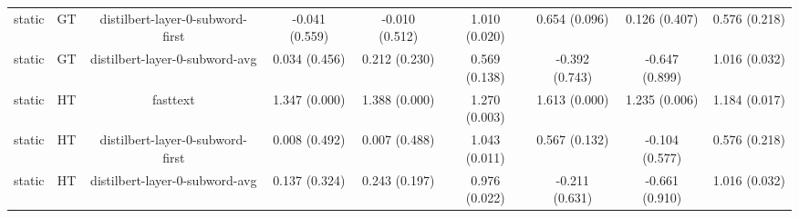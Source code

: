 \begin{sidewaystable}[htb]
\begin{tabular}{@{}ccccccccc@{}}
        static & GT & distilbert-layer-0-subword-first & -0.041 (0.559) & -0.010 (0.512) & 1.010 (0.020) & 0.654 (0.096) & 0.126 (0.407) & 0.576 (0.218) \\
        static & GT & distilbert-layer-0-subword-avg & 0.034 (0.456) & 0.212 (0.230) & 0.569 (0.138) & -0.392 (0.743) & -0.647 (0.899) & 1.016 (0.032) \\
        static & HT & fasttext & 1.347 (0.000) & 1.388 (0.000) & 1.270 (0.003) & 1.613 (0.000) & 1.235 (0.006) & 1.184 (0.017) \\
        static & HT & distilbert-layer-0-subword-first & 0.008 (0.492) & 0.007 (0.488) & 1.043 (0.011) & 0.567 (0.132) & -0.104 (0.577) & 0.576 (0.218) \\
        static & HT & distilbert-layer-0-subword-avg & 0.137 (0.324) & 0.243 (0.197) & 0.976 (0.022) & -0.211 (0.631) & -0.661 (0.910) & 1.016 (0.032) \\
        \bottomrule
    \end{tabular}
\end{sidewaystable}